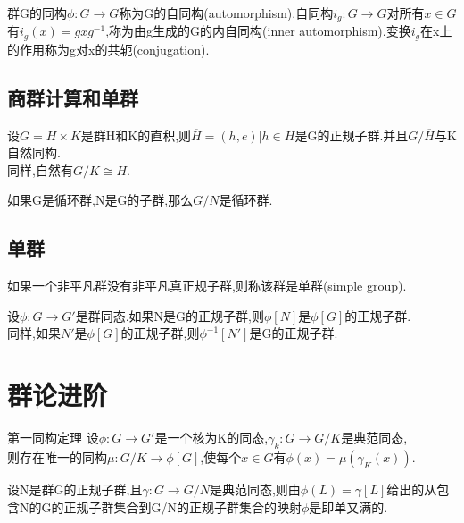 \documentclass[oneside,openany]{ctexbook}
\begin{document}
\begin{definition}{}{}
群G的同构$\phi :G\rightarrow G$称为G的自同构(automorphism).自同构$i_g :G\rightarrow G$对所有$x\in G$
有$i_g(x)=gxg^{-1}$,称为由g生成的G的内自同构(inner automorphism).变换$i_g$在x上的作用称为g对x的共轭(conjugation).
\end{definition}

\section{商群计算和单群}

\begin{definition}{}{}
设$G=H\times K$是群H和K的直积,则$\overline{H}={(h,e)|h\in H}$是G的正规子群.并且$G/\overline{H}$与K自然同构.\\
同样,自然有$G/\overline{K}\cong H$.
\end{definition}

\begin{definition}{}{}
如果G是循环群,N是G的子群,那么$G/N$是循环群.
\end{definition}

\section{单群}

\begin{definition}{}{}
如果一个非平凡群没有非平凡真正规子群,则称该群是单群(simple group).
\end{definition}

\begin{definition}{}{}
设$\phi :G\rightarrow G'$是群同态.如果N是G的正规子群,则$\phi [N]$是$\phi [G]$的正规子群.\\
同样,如果$N'$是$\phi [G]$的正规子群,则$\phi ^{-1}[N']$是G的正规子群.
\end{definition}

\chapter{群论进阶}

\begin{definition}{第一同构定理}{}
设$\phi :G\rightarrow G'$是一个核为K的同态,$\gamma _k:G\rightarrow G/K$是典范同态,\\
则存在唯一的同构$\mu :G/K\rightarrow \phi [G]$,使每个$x\in G$有$\phi (x)=\mu (\gamma _K(x))$.
\end{definition}

\begin{definition}{}{}
设N是群G的正规子群,且$\gamma :G\rightarrow G/N$是典范同态,则由$\phi (L)=\gamma[L]$给出的从包含N的G的正规子群集合到G/N的正规子群集合的映射$\phi$是即单又满的.
\end{definition}
\end{document}

